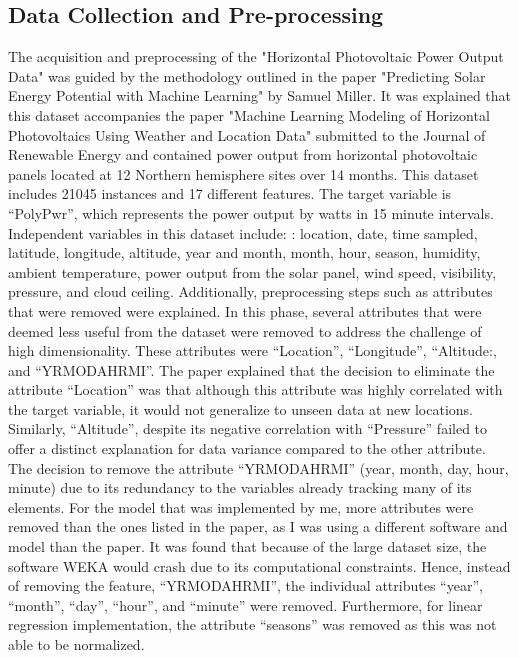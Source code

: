 \documentclass[10pt,twocolumn]{article}
\begin{document}
\subsection{Data Collection and Pre-processing}
The acquisition and preprocessing of the "Horizontal Photovoltaic Power Output Data" was guided by the methodology outlined in the paper "Predicting Solar Energy Potential with Machine Learning" by Samuel Miller. It was explained that this dataset accompanies the paper "Machine Learning Modeling of Horizontal Photovoltaics Using Weather and Location Data" submitted to the Journal of Renewable Energy and contained power output from horizontal photovoltaic panels located at 12 Northern hemisphere sites over 14 months. This dataset includes 21045 instances and 17 different features. The target variable is “PolyPwr”, which represents the power output by watts in 15 minute intervals. Independent variables in this dataset include: : location, date, time sampled, latitude, longitude, altitude, year and month, month, hour, season, humidity, ambient temperature, power output from the solar panel, wind speed, visibility, pressure, and cloud ceiling. Additionally, preprocessing steps such as attributes that were removed were explained. In this phase, several attributes that were deemed less useful from the dataset were removed to address the challenge of high dimensionality. These attributes were “Location”, “Longitude”, “Altitude:, and “YRMODAHRMI”.   The paper explained that the decision to eliminate the attribute “Location” was that  although this attribute was highly correlated with the target variable, it would not generalize to unseen data at new locations. Similarly, “Altitude”, despite its negative correlation with “Pressure” failed to offer a distinct explanation for data variance compared to the other attribute. The decision to remove the attribute “YRMODAHRMI” (year, month, day, hour, minute) due to its redundancy to the variables already tracking many of its elements. 
For the model that was implemented by me,  more attributes were removed  than the ones listed in the paper, as I was using a different software and model than the paper. It was found that because of the large dataset size, the software WEKA would crash due to its computational constraints. Hence, instead of removing the feature, “YRMODAHRMI”, the individual attributes “year”, “month”, “day”, “hour”, and “minute” were removed. Furthermore, for linear regression implementation, the attribute “seasons” was removed as this was not able to be normalized. 
\end{document}
